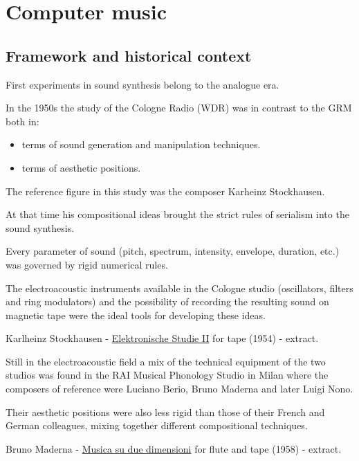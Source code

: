 \chapter{Computer music}

\section{Framework and historical context}\label{framework-and-historical-context}

First experiments in sound synthesis belong to the analogue era.

In the 1950s the study of the Cologne Radio (WDR) was in contrast to the GRM both in:

\begin{itemize}
\tightlist
\item terms of sound generation and manipulation techniques. 
\item terms of aesthetic positions.
\end{itemize}

The reference figure in this study was the composer Karheinz Stockhausen.

At that time his compositional ideas brought the strict rules of serialism into the sound synthesis.

Every parameter of sound (pitch, spectrum, intensity, envelope, duration, etc.) was governed by rigid numerical rules.

The electroacoustic instruments available in the Cologne studio (oscillators, filters and ring modulators) and the possibility of recording the resulting sound on magnetic tape were the ideal tools for developing these ideas.

Karlheinz Stockhausen - \href{http://www.musicaecodice.it/gitmedia/emc/4_media/studio2.mp3}{Elektronische Studie II} for tape (1954) - extract.

Still in the electroacoustic field a mix of the technical equipment of the two studios was found in the RAI Musical Phonology Studio in Milan where the composers of reference were Luciano Berio, Bruno Maderna and later Luigi Nono.

Their aesthetic positions were also less rigid than those of their French and German colleagues, mixing together different compositional techniques.

Bruno Maderna - \href{http://www.musicaecodice.it/gitmedia/emc/4_media/maderna.mp3}{Musica su due dimensioni} for flute and tape (1958) - extract.

